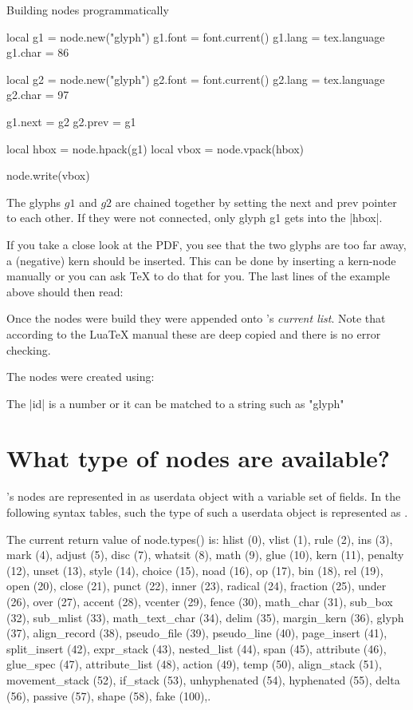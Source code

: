 \begin{texexample}{Building nodes programmatically}{}
\begin{luacode*}
local g1 = node.new("glyph")
g1.font = font.current()
g1.lang = tex.language
g1.char = 86

local g2 = node.new("glyph")
g2.font = font.current()
g2.lang = tex.language
g2.char = 97

g1.next = g2
g2.prev = g1

local hbox = node.hpack(g1)
local vbox = node.vpack(hbox)

node.write(vbox)
\end{luacode*}
\end{texexample}

The glyphs $g1$ and $g2$ are chained together by setting the next and prev pointer to each other. If they were not connected, only glyph g1 gets into the |hbox|.

If you take a close look at the PDF, you see that the two glyphs are too far away, a (negative) kern should be inserted. This can be done by inserting a kern-node manually or you can ask TeX to do that for you. The last lines of the example above should then read:

Once the nodes were build they were appended onto \tex's \textit{current list}. Note that according to the LuaTeX manual these are deep copied and there is no error checking.


The nodes were created using:


The |id| is a number or it can be matched to a  string such as "glyph"

\section{What type of nodes are available?}




\tex's nodes are represented in \LUA as userdata object with a variable set of fields. In the following
syntax tables, such the type of such a userdata object is represented as .

The current return value of node.types() is: hlist (0), vlist (1), rule (2), ins (3), mark (4),
adjust (5), disc (7), whatsit (8), math (9), glue (10), kern (11), penalty (12), unset (13), style
(14), choice (15), noad (16), op (17), bin (18), rel (19), open (20), close (21), punct (22), inner
(23), radical (24), fraction (25), under (26), over (27), accent (28), vcenter (29), fence (30),
math\_char (31), sub\_box (32), sub\_mlist (33), math\_text\_char (34), delim (35), margin\_kern
(36), glyph (37), align\_record (38), pseudo\_file (39), pseudo\_line (40), page\_insert (41),
split\_insert (42), expr\_stack (43), nested\_list (44), span (45), attribute (46), glue\_spec
(47), attribute\_list (48), action (49), temp (50), align\_stack (51), movement\_stack (52),
if\_stack (53), unhyphenated (54), hyphenated (55), delta (56), passive (57), shape (58), fake
(100),.

